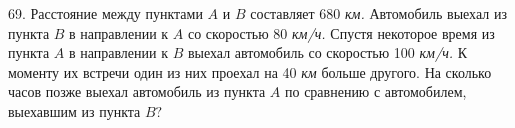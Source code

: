 69. Расстояние между пунктами $A$ и $B$ составляет 680 {\it км.} Автомобиль выехал из пункта $B$ в направлении к $A$ со скоростью 80 {\it км/ч.} Спустя некоторое время из пункта $A$ в направлении к $B$ выехал автомобиль со скоростью 100 {\it км/ч.} К моменту их встречи один из них проехал на 40 {\it км} больше другого. На сколько часов позже выехал автомобиль из пункта $A$ по сравнению с автомобилем, выехавшим из пункта $B?$\\
